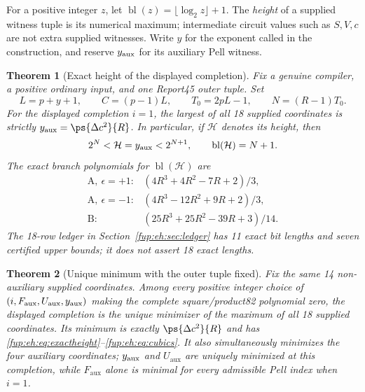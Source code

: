 \documentclass[11pt,letterpaper]{article}
\newtheorem{theorem}{Theorem}[section]
\theoremstyle{definition}\newtheorem{definition}[theorem]{Definition}
\theoremstyle{remark}\newtheorem{remark}[theorem]{Remark}
\newcommand{\code}[1]{\texttt{\detokenize{#1}}}
\newcommand{\D}{\Delta}
\newcommand{\Fa}{F_{\mathrm{aux}}}\newcommand{\Ua}{U_{\mathrm{aux}}}\newcommand{\ttt}{t_{\mathrm{tr}}}
\newcommand{\bl}{\operatorname{bl}}
\begin{document}
For a positive integer $z$, let $\bl(z)=\lfloor\log_2z\rfloor+1$.
The \emph{height} of a supplied witness tuple is its numerical maximum;
intermediate circuit values such as $S,V,c$ are not extra supplied
witnesses. Write $y$ for the exponent called \code{yexp} in the
construction, and reserve $y_{\mathrm{aux}}$ for its auxiliary Pell witness.

\begin{theorem}[Exact height of the displayed completion]
\label{fup:eh:thm:height}
Fix a genuine compiler, a positive ordinary input, and one Report45
outer tuple. Set
\[
 L=p+y+1,\qquad C=(p-1)L,\qquad
 T_0=2pL-1,\qquad N=(R-1)T_0.
\]
For the displayed completion $i=1$, the largest of all 18 supplied
coordinates is strictly $\yaux=\ps{\D c^2}{R}$. In particular, if
$\mathcal H$ denotes its height, then
\begin{equation}\label{fup:eh:eq:exactheight}
 2^N<\mathcal H=\yaux<2^{N+1},\qquad \bl(\mathcal H)=N+1.
\end{equation}
The exact branch polynomials for $\bl(\mathcal H)$ are
\begin{equation}\label{fup:eh:eq:cubics}
\begin{array}{ll}
 \mathrm A,\ \epsilon=+1:&(4R^3+4R^2-7R+2)/3,\\
 \mathrm A,\ \epsilon=-1:&(4R^3-12R^2+9R+2)/3,\\
 \mathrm B:&(25R^3+25R^2-39R+3)/14.
\end{array}
\end{equation}
The 18-row ledger in Section~\ref{fup:eh:sec:ledger} has 11 exact bit lengths
and seven certified upper bounds; it does not assert 18 exact lengths.
\end{theorem}

\begin{theorem}[Unique minimum with the outer tuple fixed]
\label{fup:eh:thm:min}
Fix the same 14 non-auxiliary supplied coordinates. Among every
positive integer choice of $(i,\Fa,\Ua,\yaux)$ making the complete
square/product82 polynomial zero, the displayed completion is the
unique minimizer of the maximum of all 18 supplied coordinates.
Its minimum is exactly $\ps{\D c^2}{R}$ and has
\eqref{fup:eh:eq:exactheight}--\eqref{fup:eh:eq:cubics}. It also simultaneously
minimizes the four auxiliary coordinates; $y_{\mathrm{aux}}$ and $\Ua$ are uniquely
minimized at this completion, while $\Fa$ alone is minimal for every
admissible Pell index when $i=1$.
\end{theorem}
\end{document}
